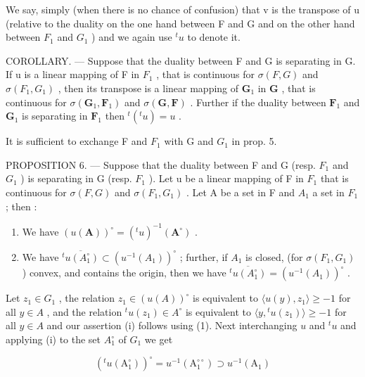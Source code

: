 We say, simply (when there is no chance of confusion) that v is the transpose of u (relative to the duality on the one hand between F and G and on the other hand between \(F_{1}\) and \(G_{1}\) ) and we again use \(^{t}u\) to denote it.

COROLLARY. --- Suppose that the duality between F and G is separating in G. If u is a linear mapping of F in \(F_{1}\) , that is continuous for \(\sigma(F, G)\) and \(\sigma(F_{1}, G_{1})\) , then its transpose is a linear mapping of \(\mathbf{G}_1\) in \(\mathbf{G}\) , that is continuous for \(\sigma (\mathbf{G}_1,\mathbf{F}_1)\) and \(\sigma (\mathbf{G},\mathbf{F})\) . Further if the duality between \(\mathbf{F}_1\) and \(\mathbf{G}_1\) is separating in \(\mathbf{F}_1\) then \(^{t}(^{t} u) = u\) .

It is sufficient to exchange F and \(F_{1}\) with G and \(G_{1}\) in prop. 5.

PROPOSITION 6. --- Suppose that the duality between F and G (resp. \(F_{1}\) and \(G_{1}\) ) is separating in G (resp. \(F_{1}\) ). Let u be a linear mapping of F in \(F_{1}\) that is continuous for \(\sigma(F, G)\) and \(\sigma(F_{1}, G_{1})\) . Let A be a set in F and \(A_{1}\) a set in \(F_{1}\) ; then :

\begin{enumerate}
\def\labelenumi{(\roman{enumi})}
\item
  We have \((u(\mathbf{A}))^{\circ} = ({}^{t} u)^{-1} (\mathbf{A}^{\circ})\) .
\item
  We have \(\overline{{}^{t}u(A_1^\circ)}\subset (u^{-1}(A_1))^{\circ}\) ; further, if \(A_1\) is closed, (for \(\sigma(F_1,G_1)\) ) convex, and contains the origin, then we have \(\overline{{}^{t}u(A_1^\circ)} = (u^{-1}(A_1))^{\circ}\) .
\end{enumerate}

Let \(z_{1} \in G_{1}\) , the relation \(z_{1} \in (u(A))^{\circ}\) is equivalent to \(\langle u(y), z_{1} \rangle \geqslant -1\) for all \(y \in A\) , and the relation \({}^{t}u(z_{1}) \in A^{\circ}\) is equivalent to \(\langle y, {}^{t}u(z_{1}) \rangle \geqslant -1\) for all \(y \in A\) and our assertion (i) follows using (1). Next interchanging \(u\) and \({}^{t}u\) and applying (i) to the set \(A_{1}^{\circ}\) of \(G_{1}\) we get

\[
\left(^ {t} u \left(\mathrm{A} _ {1} ^ {\circ}\right)\right) ^ {\circ} = u ^ {- 1} \left(\mathrm{A} _ {1} ^ {\circ \circ}\right) \supset u ^ {- 1} \left(\mathrm{A} _ {1}\right)\tag{2}
\]

